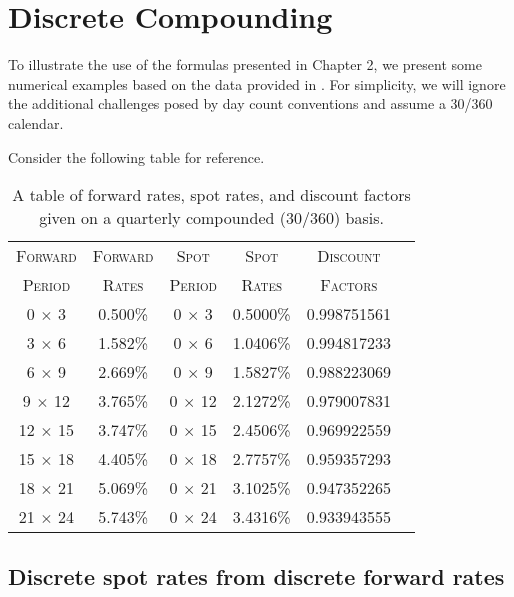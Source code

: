 
\section{Discrete Compounding}
\label{append_A1}
To illustrate the use of the formulas presented in Chapter 2, we present some numerical examples based on the data provided in \cite{smith2011bond}. For simplicity, we will ignore the additional challenges posed by day count conventions and assume a 30/360 calendar.

Consider the following table for reference. 

\begin{table}[ht]
\begin{center}
\begin{tabular}{cccccc}

\toprule
\textsc{Forward} & \textsc{Forward} & \textsc{Spot} & \textsc{Spot} & \textsc{Discount} \\
\textsc{Period} & \textsc{Rates} & \textsc{Period} & \textsc{Rates} & \textsc{Factors}\\
\toprule

0 $\times$ 3 & 0.500\% & 0 $\times$ 3 & 0.5000\% & 0.998751561 \\
3 $\times$ 6 & 1.582\% & 0 $\times$ 6 & 1.0406\% & 0.994817233 \\
6 $\times$ 9 & 2.669\% & 0 $\times$ 9 & 1.5827\% & 0.988223069 \\
9 $\times$ 12 & 3.765\% & 0 $\times$ 12 & 2.1272\% & 0.979007831 \\
12 $\times$ 15 & 3.747\% & 0 $\times$ 15 & 2.4506\% & 0.969922559 \\
15 $\times$ 18 & 4.405\% & 0 $\times$ 18 & 2.7757\% & 0.959357293 \\
18 $\times$ 21 & 5.069\% & 0 $\times$ 21 & 3.1025\% & 0.947352265 \\
21 $\times$ 24 & 5.743\% & 0 $\times$ 24 & 3.4316\% & 0.933943555 \\
\toprule

\end{tabular}
\end{center}
\caption[Numerical Example--Discrete Compounding Formulas]{A table of forward rates, spot rates, and discount factors given on a quarterly compounded (30/360) basis.}
\label{tab:numerical_ex_1}
\end{table}

\newpage 

\subsection{Discrete spot rates from discrete forward rates}

